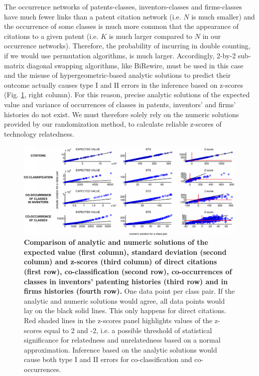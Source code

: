 \documentclass[pre,reprint,groupedaddress,superscriptaddress]{revtex4-1}
\begin{document}
The occurrence networks of patents-classes, inventors-classes and firms-classes have much fewer links than a patent citation network (i.e. $N$ is much smaller) and the occurrence of some classes is much more common that the appearance of citations to a given patent (i.e. $K$ is much larger compared to $N$ in our occurrence networks). Therefore, the probability of incurring in double counting, if we would use permutation algorithms, is much larger. Accordingly, 2-by-2 sub-matrix diagonal swapping algorithms, like BiRewire, must be used in this case and the misuse of hypergeometric-based analytic solutions to predict their outcome actually causes type I and II errors in the inference based on z-scores (Fig. \ref{Comparison_ANAvsNUM}, right column). For this reason, precise analytic solutions of the expected value and variance of occurrences of classes in patents, inventors' and firms' histories do not exist. We must therefore solely rely on the numeric solutions provided by our randomization method, to calculate reliable z-scores of technology relatedness.        
\begin{figure}[]
\centering
\includegraphics[width=\textwidth]{figs/Comparison_ANAvsNUM.pdf} 
\caption{\textbf{Comparison of analytic and numeric solutions of the expected value (first column), standard deviation (second column) and z-scores (third column) of direct citations (first row), co-classification (second row), co-occurrences of classes in inventors' patenting histories (third row) and in firms histories (fourth row).} One data point per class pair. If the analytic and numeric solutions would agree, all data points would lay on the black solid lines. This only happens for direct citations. Red shaded lines in the z-scores panel highlights values of the z-scores equal to 2 and -2, i.e. a possible threshold of statistical significance for relatedness and unrelatedness based on a normal approximation. Inference based on the analytic solutions would cause both type I and II errors for co-classification and co-occurrences. 
}\label{Comparison_ANAvsNUM}
\end{figure}
\end{document}
